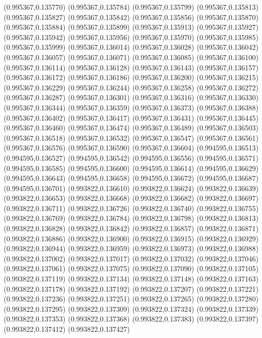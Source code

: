 (0.995367,0.135770)
(0.995367,0.135784)
(0.995367,0.135799)
(0.995367,0.135813)
(0.995367,0.135827)
(0.995367,0.135842)
(0.995367,0.135856)
(0.995367,0.135870)
(0.995367,0.135884)
(0.995367,0.135899)
(0.995367,0.135913)
(0.995367,0.135927)
(0.995367,0.135942)
(0.995367,0.135956)
(0.995367,0.135970)
(0.995367,0.135985)
(0.995367,0.135999)
(0.995367,0.136014)
(0.995367,0.136028)
(0.995367,0.136042)
(0.995367,0.136057)
(0.995367,0.136071)
(0.995367,0.136085)
(0.995367,0.136100)
(0.995367,0.136114)
(0.995367,0.136128)
(0.995367,0.136143)
(0.995367,0.136157)
(0.995367,0.136172)
(0.995367,0.136186)
(0.995367,0.136200)
(0.995367,0.136215)
(0.995367,0.136229)
(0.995367,0.136244)
(0.995367,0.136258)
(0.995367,0.136272)
(0.995367,0.136287)
(0.995367,0.136301)
(0.995367,0.136316)
(0.995367,0.136330)
(0.995367,0.136344)
(0.995367,0.136359)
(0.995367,0.136373)
(0.995367,0.136388)
(0.995367,0.136402)
(0.995367,0.136417)
(0.995367,0.136431)
(0.995367,0.136445)
(0.995367,0.136460)
(0.995367,0.136474)
(0.995367,0.136489)
(0.995367,0.136503)
(0.995367,0.136518)
(0.995367,0.136532)
(0.995367,0.136547)
(0.995367,0.136561)
(0.995367,0.136576)
(0.995367,0.136590)
(0.995367,0.136604)
(0.994595,0.136513)
(0.994595,0.136527)
(0.994595,0.136542)
(0.994595,0.136556)
(0.994595,0.136571)
(0.994595,0.136585)
(0.994595,0.136600)
(0.994595,0.136614)
(0.994595,0.136629)
(0.994595,0.136643)
(0.994595,0.136658)
(0.994595,0.136672)
(0.994595,0.136687)
(0.994595,0.136701)
(0.993822,0.136610)
(0.993822,0.136624)
(0.993822,0.136639)
(0.993822,0.136653)
(0.993822,0.136668)
(0.993822,0.136682)
(0.993822,0.136697)
(0.993822,0.136711)
(0.993822,0.136726)
(0.993822,0.136740)
(0.993822,0.136755)
(0.993822,0.136769)
(0.993822,0.136784)
(0.993822,0.136798)
(0.993822,0.136813)
(0.993822,0.136828)
(0.993822,0.136842)
(0.993822,0.136857)
(0.993822,0.136871)
(0.993822,0.136886)
(0.993822,0.136900)
(0.993822,0.136915)
(0.993822,0.136929)
(0.993822,0.136944)
(0.993822,0.136959)
(0.993822,0.136973)
(0.993822,0.136988)
(0.993822,0.137002)
(0.993822,0.137017)
(0.993822,0.137032)
(0.993822,0.137046)
(0.993822,0.137061)
(0.993822,0.137075)
(0.993822,0.137090)
(0.993822,0.137105)
(0.993822,0.137119)
(0.993822,0.137134)
(0.993822,0.137148)
(0.993822,0.137163)
(0.993822,0.137178)
(0.993822,0.137192)
(0.993822,0.137207)
(0.993822,0.137221)
(0.993822,0.137236)
(0.993822,0.137251)
(0.993822,0.137265)
(0.993822,0.137280)
(0.993822,0.137295)
(0.993822,0.137309)
(0.993822,0.137324)
(0.993822,0.137339)
(0.993822,0.137353)
(0.993822,0.137368)
(0.993822,0.137383)
(0.993822,0.137397)
(0.993822,0.137412)
(0.993822,0.137427)

